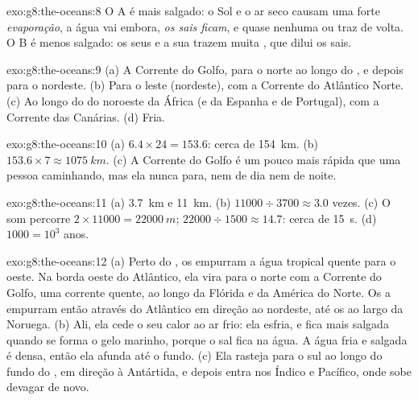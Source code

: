 \begin{solution}{exo:g8:the-oceans:8}
O  A é mais salgado: o Sol e o ar seco causam uma forte
\emph{evaporação}, a água vai embora, \emph{os sais ficam}, e quase
nenhuma  ou  traz \emph{} de volta. O  B é menos
salgado: os seus  e a sua  trazem muita \emph{}, que
dilui os sais.
\end{solution}

\begin{solution}{exo:g8:the-oceans:9}
(a) A Corrente do Golfo, para o norte ao longo do , e depois para o
nordeste. (b) Para o leste (nordeste), com a Corrente do Atlântico Norte.
(c) Ao longo do  do noroeste da África (e da Espanha e de
Portugal), com a Corrente das Canárias. (d) Fria.
\end{solution}

\begin{solution}{exo:g8:the-oceans:10}
(a) $6.4 \times 24 = 153.6$: cerca de \qty{154}{km}. (b) $153.6 \times 7
\approx \qty{1075}{km}$. (c) A Corrente do Golfo é um pouco mais rápida
que uma pessoa caminhando, mas ela nunca para, nem de dia nem de noite.
\end{solution}

\begin{solution}{exo:g8:the-oceans:11}
(a) \qty{3.7}{km} e \qty{11}{km}. (b) $11000 \div 3700 \approx 3.0$
vezes. (c) O som percorre $2 \times 11000 = \qty{22000}{m}$; $22000
\div 1500 \approx 14.7$: cerca de \qty{15}{s}. (d) $1000 = 10^3$ anos.
\end{solution}

\begin{solution}{exo:g8:the-oceans:12}
(a) Perto do , os  empurram a água tropical quente para o
oeste. Na borda oeste do Atlântico, ela vira para o norte com a Corrente
do Golfo, uma corrente quente, ao longo da Flórida e da América do Norte.
Os  a empurram então através do Atlântico em direção ao
nordeste, até os  ao largo da Noruega. (b) Ali, ela cede o seu calor
ao ar frio: ela esfria, e fica mais salgada quando se forma o gelo
marinho, porque o sal fica na água. A água fria e salgada é densa, então
ela afunda até o fundo. (c) Ela rasteja para o sul ao longo do fundo do
, em direção à Antártida, e depois entra nos  Índico e
Pacífico, onde sobe devagar de novo.
\end{solution}

